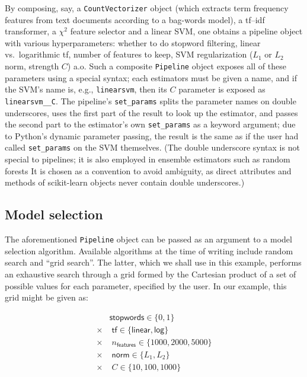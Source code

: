 \documentclass{llncs}
\begin{document}
By composing, say, a \texttt{CountVectorizer} object
(which extracts term frequency features from text documents
according to a bag-words model),
a \textsf{tf--idf} transformer, a $\chi^2$ feature selector and a linear SVM,
one obtains a pipeline object with various hyperparameters:
whether to do stopword filtering,
linear vs.\ logarithmic \textsf{tf}, number of features to keep,
SVM regularization ($L_1$ or $L_2$ norm, strength $C$) a.o.
Such a composite \texttt{Pipeline} object
exposes all of these parameters using a special syntax;
each estimators must be given a name,
and if the SVM's name is, e.g., \texttt{linearsvm},
then its $C$ parameter is exposed as \texttt{linearsvm\_\_C}.
The pipeline's \texttt{set\_params} splits the parameter names
on double underscores, uses the first part of the result
to look up the estimator,
and passes the second part to the estimator's own \texttt{set\_params}
as a keyword argument; due to Python's dynamic parameter passing,
the result is the same as if the user had called \texttt{set\_params}
on the SVM themselves.
(The double underscore syntax is not special to pipelines;
it is also employed in ensemble estimators such as random forests
It is chosen as a convention to avoid ambiguity, as direct
attributes and methods of scikit-learn objects never contain
double underscores.)

\subsection{Model selection}

The aforementioned \texttt{Pipeline} object
can be passed as an argument to a model selection algorithm.
Available algorithms at the time of writing include random search
\citep{bergstra2012} and ``grid search''.
The latter, which we shall use in this example,
performs an exhaustive search through a grid formed by the Cartesian product
of a set of possible values for each parameter, specified by the user.
In our example, this grid might be given as:

\begin{align*}
         & \textsf{stopwords} \in \{0, 1\}                      \\
  \times & \; \textsf{tf} \in \{\textsf{linear}, \textsf{log}\} \\
  \times & \; n_\textsf{features} \in \{1000, 2000, 5000\}      \\
  \times & \; \textsf{norm} \in \{L_1, L_2\}                    \\
  \times & \; C \in \{10, 100, 1000\}
\end{align*}
\end{document}
